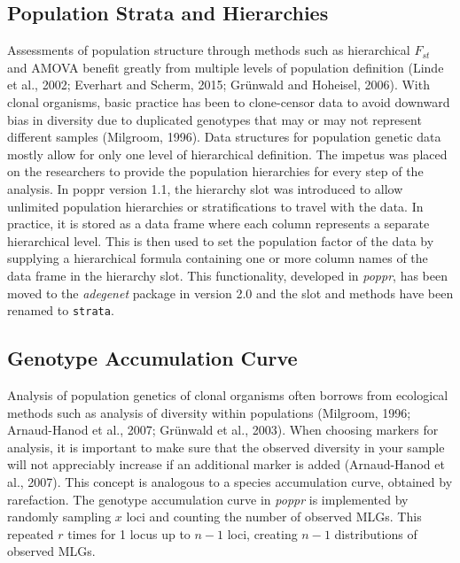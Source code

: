 \documentclass{frontiersSCNS} %
\begin{document}
\subsection*{Population Strata and
Hierarchies}\label{population-strata-and-hierarchies}

Assessments of population structure through methods such as hierarchical
\(F_{st}\) and AMOVA benefit greatly from multiple levels of population
definition (Linde et al., 2002; Everhart and Scherm, 2015; Gr{ü}nwald
and Hoheisel, 2006). With clonal organisms, basic practice has been to
clone-censor data to avoid downward bias in diversity due to duplicated
genotypes that may or may not represent different samples (Milgroom,
1996). Data structures for population genetic data mostly allow for only
one level of hierarchical definition. The impetus was placed on the
researchers to provide the population hierarchies for every step of the
analysis. In poppr version 1.1, the hierarchy slot was introduced to
allow unlimited population hierarchies or stratifications to travel with
the data. In practice, it is stored as a data frame where each column
represents a separate hierarchical level. This is then used to set the
population factor of the data by supplying a hierarchical formula
containing one or more column names of the data frame in the hierarchy
slot. This functionality, developed in \emph{poppr}, has been moved to
the \emph{adegenet} package in version 2.0 and the slot and methods have
been renamed to \texttt{strata}.

\subsection*{Genotype Accumulation
Curve}\label{genotype-accumulation-curve}

Analysis of population genetics of clonal organisms often borrows from
ecological methods such as analysis of diversity within populations
(Milgroom, 1996; Arnaud-Hanod et al., 2007; Grünwald et al., 2003). When
choosing markers for analysis, it is important to make sure that the
observed diversity in your sample will not appreciably increase if an
additional marker is added (Arnaud-Hanod et al., 2007). This concept is
analogous to a species accumulation curve, obtained by rarefaction. The
genotype accumulation curve in \emph{poppr} is implemented by randomly
sampling \(x\) loci and counting the number of observed MLGs. This
repeated \(r\) times for 1 locus up to \(n-1\) loci, creating \(n-1\)
distributions of observed MLGs.
\end{document}
